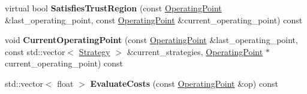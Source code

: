 \begin{DoxyCompactItemize}
\item 
virtual bool {\bfseries Satisfies\+Trust\+Region} (const \hyperlink{structilqgames_1_1_operating_point}{Operating\+Point} \&last\+\_\+operating\+\_\+point, const \hyperlink{structilqgames_1_1_operating_point}{Operating\+Point} \&current\+\_\+operating\+\_\+point) const \hypertarget{classilqgames_1_1_game_solver_a8d130435ee6d534d1d93251b00416dee}{}\label{classilqgames_1_1_game_solver_a8d130435ee6d534d1d93251b00416dee}

\item 
void {\bfseries Current\+Operating\+Point} (const \hyperlink{structilqgames_1_1_operating_point}{Operating\+Point} \&last\+\_\+operating\+\_\+point, const std\+::vector$<$ \hyperlink{structilqgames_1_1_strategy}{Strategy} $>$ \&current\+\_\+strategies, \hyperlink{structilqgames_1_1_operating_point}{Operating\+Point} $\ast$current\+\_\+operating\+\_\+point) const \hypertarget{classilqgames_1_1_game_solver_ae13927d570a00ff73c9556218bff773d}{}\label{classilqgames_1_1_game_solver_ae13927d570a00ff73c9556218bff773d}

\item 
std\+::vector$<$ float $>$ {\bfseries Evaluate\+Costs} (const \hyperlink{structilqgames_1_1_operating_point}{Operating\+Point} \&op) const \hypertarget{classilqgames_1_1_game_solver_a38e4812eb9b9537d5a0811a9bf85df97}{}\label{classilqgames_1_1_game_solver_a38e4812eb9b9537d5a0811a9bf85df97}

\end{DoxyCompactItemize}

